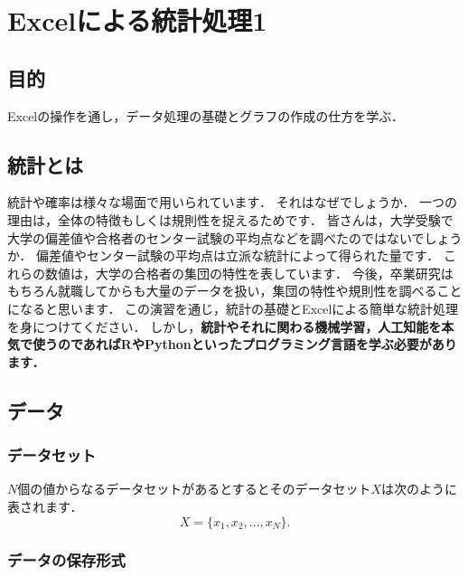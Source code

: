 
\chapter{Excelによる統計処理1}
\setcounter{num_prac}{0}

\section{目的}

Excelの操作を通し，データ処理の基礎とグラフの作成の仕方を学ぶ．

\section{統計とは}

統計や確率は様々な場面で用いられています．
それはなぜでしょうか．
一つの理由は，全体の特徴もしくは規則性を捉えるためです．
皆さんは，大学受験で大学の偏差値や合格者のセンター試験の平均点などを調べたのではないでしょうか．
偏差値やセンター試験の平均点は立派な統計によって得られた量です．
これらの数値は，大学の合格者の集団の特性を表しています．
今後，卒業研究はもちろん就職してからも大量のデータを扱い，集団の特性や規則性を調べることになると思います．
この演習を通じ，統計の基礎とExcelによる簡単な統計処理を身につけてください．
しかし，{\bf 統計やそれに関わる機械学習，人工知能を本気で使うのであればRやPythonといったプログラミング言語を学ぶ必要があります．}

\section{データ}
\subsection{データセット}

$N$個の値からなるデータセットがあるとするとそのデータセット$X$は次のように表されます．
\begin{equation}
    \label{eq:2}
    X = \{x_1, x_2, ..., x_N\}.
\end{equation}

\subsection{データの保存形式}

